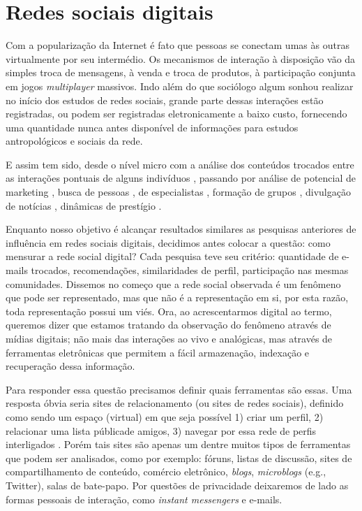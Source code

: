 \section{Redes sociais digitais}
\label{sec:redes_dig}
Com a popularização da Internet é fato que pessoas se conectam umas às outras
virtualmente por seu intermédio. Os mecanismos de interação à disposição vão da
simples troca de mensagens, à venda e troca de produtos, à participação conjunta
em jogos \textit{multiplayer} massivos. Indo além do que sociólogo algum sonhou
realizar no início dos estudos de redes sociais, grande parte dessas interações
estão registradas, ou podem ser registradas eletronicamente a baixo custo,
fornecendo uma quantidade nunca antes disponível de informações para
estudos antropológicos e sociais da rede.

E assim tem sido, desde o nível micro com a análise dos conteúdos trocados entre
as interações pontuais de alguns indivíduos \citep{Recuero2008}, passando por
análise de potencial de marketing \citep{Clemons2007, Domingos2001,
Richardson2002, Ma2008}, busca de pessoas \citep{ADAMIC2005}, de especialistas
\citep{Ehrlich2007}, formação de grupos \citep{Adamic2003, Backstrom2006,
Kumar2006}, divulgação de notícias \citep{Gruhl2004}, dinâmicas de prestígio
\citep{Salganik2006, Song2007}.

Enquanto nosso objetivo é alcançar resultados similares as pesquisas anteriores
de influência em redes sociais digitais, decidimos antes colocar a questão: como
mensurar a rede social digital? Cada pesquisa teve seu critério: quantidade de
e-mails trocados, recomendações, similaridades de perfil, participação nas mesmas
comunidades. Dissemos no começo que a rede social observada é um fenômeno que
pode ser representado, mas que não é a representação em si, por esta razão, toda
representação possui um viés. Ora, ao acrescentarmos digital ao termo,
queremos dizer que estamos tratando da observação do fenômeno através de mídias
digitais; não mais das interações ao vivo e analógicas, mas através de
ferramentas eletrônicas que permitem a fácil armazenação, indexação e recuperação
dessa informação.

Para responder essa questão precisamos definir quais ferramentas são essas. Uma
resposta óbvia seria sites de relacionamento (ou sites de redes sociais),
definido como sendo um espaço (virtual) em que seja possível 1) criar um perfil,
2) relacionar uma lista públicade amigos, 3) navegar por essa rede de perfis
interligados \citep{Boyd2007}. Porém tais sites são apenas um dentre muitos tipos
de ferramentas que podem ser analisados, como por exemplo: fóruns, listas de
discussão, sites de compartilhamento de conteúdo, comércio eletrônico,
\emph{blogs}, \emph{microblogs} (e.g., Twitter), salas de bate-papo. Por questões
de privacidade deixaremos de lado as formas pessoais de interação, como
\emph{instant messengers} e e-mails.

